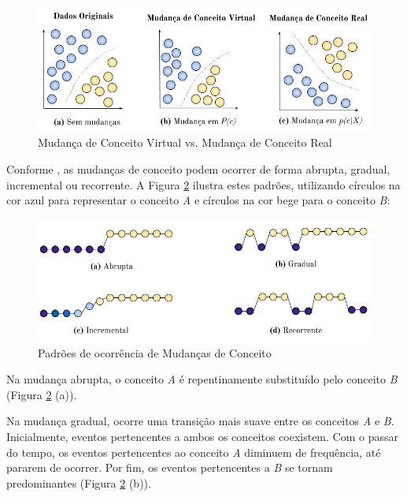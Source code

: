 \documentclass[msc, classic, a4paper]{ufbathesis}
\begin{document}
\begin{figure}[H]
\begin{center}
    \includegraphics[scale=0.8]{imagens/concept_drift.png}
    \caption{Mudança de Conceito Virtual vs. Mudança de Conceito Real}
    \label{fig:real_and_virtual_concept_drift}
\end{center}
\end{figure}

Conforme , as mudanças de conceito podem ocorrer de forma abrupta, gradual, incremental ou recorrente.
A Figura \ref{fig:concept_drift_patterns} ilustra estes padrões,
utilizando círculos na cor azul para representar o conceito \textit{A} e círculos na cor bege para o conceito \textit{B}:

\begin{figure}[H]
\begin{center}
    \includegraphics[scale=0.8]{imagens/concept_drift_patterns.png}
    \caption{Padrões de ocorrência de Mudanças de Conceito}
    \label{fig:concept_drift_patterns}
\end{center}
\end{figure}

Na mudança abrupta, o conceito \textit{A} é repentinamente substituído pelo conceito \textit{B} (Figura \ref{fig:concept_drift_patterns} (a)).

Na mudança gradual, ocorre uma transição mais suave entre os conceitos \textit{A} e \textit{B}.
Inicialmente, eventos pertencentes a ambos os conceitos coexistem.
Com o passar do tempo, os eventos pertencentes ao conceito \textit{A} diminuem de frequência, até pararem de ocorrer.
Por fim, os eventos pertencentes a \textit{B} se tornam predominantes (Figura \ref{fig:concept_drift_patterns} (b)).
\end{document}
